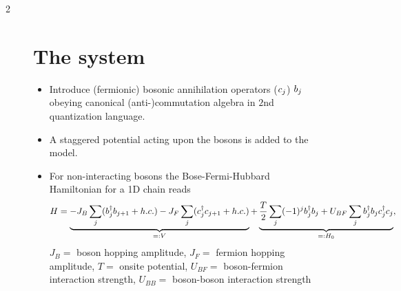 \documentclass[a0,plainsections]{sciposter}
\begin{document}
\begin{multicols}{2}
	\begin{figure}[H]
    \section{The system}
		\vspace{+10pt}

	   \begin{itemize}
			\item Introduce (fermionic) bosonic annihilation operators ($c_{j}$) $b_{j}$  obeying canonical (anti-)commutation algebra in $2$nd quantization language.
			\item A staggered potential \cite{Karch2025} acting upon the bosons is added to the model.
			\item For non-interacting bosons the Bose-Fermi-Hubbard Hamiltonian for a 1D chain reads
				\begin{equation}
					H=\underbrace{-J_B \sum_j (b_{j}^{\dagger}b_{j+1}+h.c.) - J_F\sum_j (c_{j}^{\dagger}c_{j+1}+h.c.)}_{=:V}
					+\underbrace{\frac{T}{2}\sum_j (-1)^j b_{j}^{\dagger}b_{j} + U_{BF}\sum_j b_{j}^{\dagger}b_{j}c_{j}^{\dagger}c_{j}}_{=:H_0},
				\label{eq:bh_new}
				\end{equation}
				$J_B=$ boson hopping amplitude, $J_F=$ fermion hopping amplitude, $T=$ onsite potential, $U_{BF}=$ boson-fermion interaction strength, $U_{BB}=$ boson-boson interaction strength
		\end{itemize}


\end{figure}
\end{multicols}
\end{document}
